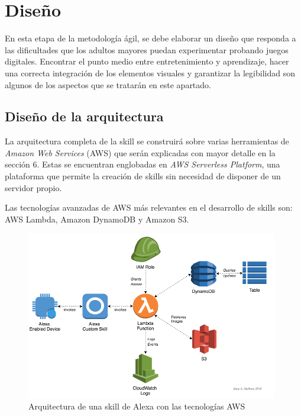 \section{Diseño}

En esta etapa de la metodología ágil, se debe elaborar un diseño que responda a las dificultades que los adultos mayores puedan experimentar probando juegos digitales. Encontrar el punto medio entre entretenimiento y aprendizaje, hacer una correcta integración de los elementos visuales y garantizar la legibilidad son algunos de los aspectos que se tratarán en este apartado.

\subsection{Diseño de la arquitectura}

La arquitectura completa de la skill se construirá sobre varias herramientas de \textit{Amazon Web Services} (AWS) que serán explicadas con mayor detalle en la sección 6. Estas se encuentran englobadas en \textit{AWS Serverless Platform}, una plataforma que permite la creación de skills sin necesidad de disponer de un servidor propio. 

Las tecnologías avanzadas de AWS más relevantes en el desarrollo de skills son: AWS Lambda, Amazon DynamoDB y Amazon S3.

\begin{figure}[H]
	\centering
	\includegraphics[width=0.98\textwidth]{imgs/arquitectura-skill.png}
	\caption{Arquitectura de una skill de Alexa con las tecnologías AWS \parencite{arquitecturaSkill}}
	\label{fig:arquitectura-skill}
\end{figure}

